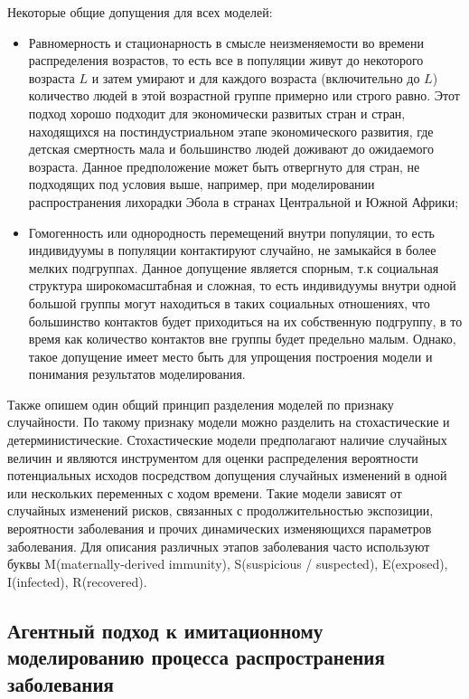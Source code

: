 Некоторые общие допущения для всех моделей:
\begin{itemize}
	\item Равномерность и стационарность в смысле неизменяемости во времени  распределения возрастов, то есть все в популяции живут до некоторого возраста $\mathit{L}$ и затем умирают и для каждого возраста (включительно до $\mathit{L}$) количество людей в этой возрастной группе примерно или строго равно. Этот подход хорошо подходит для экономически развитых стран и стран, находящихся на постиндустриальном этапе экономического развития, где детская смертность мала и большинство людей доживают до ожидаемого возраста. Данное предположение может быть отвергнуто для стран, не подходящих под условия выше, например, при моделировании распространения лихорадки Эбола в странах Центральной и Южной Африки;
	\item Гомогенность или однородность перемещений внутри популяции, то есть индивидуумы  в популяции контактируют случайно, не замыкайся в более мелких подгруппах. Данное допущение является спорным, т.к социальная структура широкомасштабная и сложная, то есть индивидуумы внутри одной большой группы могут находиться в таких социальных отношениях, что большинство контактов будет приходиться на их собственную подгруппу, в то время как количество контактов вне группы будет предельно малым. Однако, такое допущение имеет место быть для упрощения построения модели   и понимания результатов моделирования.
\end{itemize}


Также опишем один общий принцип разделения моделей по признаку случайности. По такому признаку  модели можно разделить на стохастические и детерминистические. Стохастические модели предполагают наличие случайных величин  и являются инструментом для оценки распределения вероятности потенциальных исходов  посредством допущения случайных изменений в одной или нескольких переменных с ходом времени. Такие модели зависят от случайных изменений рисков, связанных с продолжительностью экспозиции, вероятности заболевания и прочих динамических изменяющихся параметров заболевания. Для описания различных этапов заболевания часто используют буквы M(maternally-derived immunity), S(suspicious / suspected), E(exposed), I(infected), R(recovered).

\subsection{Агентный подход к имитационному моделированию процесса распространения заболевания}

